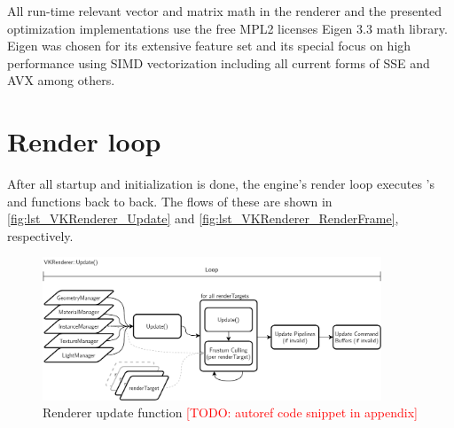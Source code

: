 All run-time relevant vector and matrix math in the renderer and the presented optimization implementations use the free MPL2 licenses Eigen 3.3 math library. Eigen was chosen for its extensive feature set and its special focus on high performance using SIMD vectorization including all current forms of SSE and AVX among others\cite{Guennebaud.2010}.

\section{Render loop} 
After all startup and initialization is done, the engine's render loop executes 's  and  functions back to back. The flows of these are shown in \autoref{fig:lst_VKRenderer_Update} and \autoref{fig:lst_VKRenderer_RenderFrame}, respectively. 

\begin{figure}[htb]
  \centering
  \includegraphics[width=0.9\textwidth]{pictures/Tachyon_VKRenderer_Update}
  \caption[VKRenderer's Update]{Renderer update function \textcolor{red}{[TODO: autoref code snippet in appendix]}}\label{fig:lst_VKRenderer_Update}
\end{figure} 


